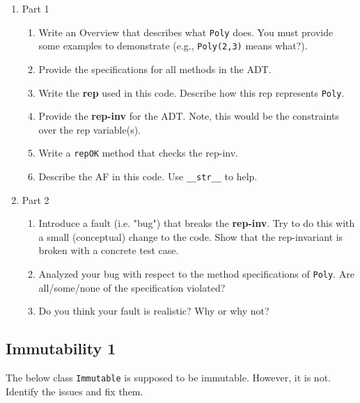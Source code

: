 \documentclass[oneside,11pt,dvipsnames]{book}
\newcommand{\sol}[1]{\iftoggle{usesol}{\textbf{Sol:} #1}{}}
\newcommand{\code}[1]{\texttt{#1}}
\begin{document}
\begin{enumerate}
        \item Part 1
\begin{enumerate}
\item Write an Overview that describes what \code{Poly} does. You must provide some examples to demonstrate (e.g., \code{Poly(2,3)} means what?).
\item Provide the specifications for all methods in the ADT. 
\item Write the \textbf{rep} used in this code.  Describe how this rep represents \code{Poly}.
\item Provide the \textbf{rep-inv} for the ADT. Note, this would be the constraints over the rep variable(s).
\item Write a \code{repOK} method that checks the rep-inv.
\item Describe the AF in this code. Use \code{\_\_str\_\_} to help.
\end{enumerate}

        \item Part 2
\begin{enumerate}
        \item Introduce a fault (i.e. "bug") that breaks the \textbf{rep-inv}. Try to do this with a small (conceptual) change to the code. Show that the rep-invariant is broken with a concrete test case.
        \item Analyzed your bug with respect to the method specifications of \code{Poly}. Are all/some/none of the specification violated?
        \item Do you think your fault is realistic? Why or why not?
\end{enumerate}
        
\end{enumerate}


\subsection{Immutability 1}\label{exercise:immutability1}

The below class \code{Immutable} is supposed to be immutable. However, it is not. Identify the issues and fix them.  

\end{document}
